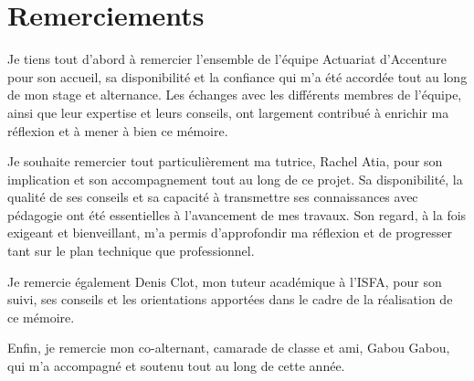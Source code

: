 \chapter*{Remerciements}
{}

Je tiens tout d'abord à remercier l'ensemble de l'équipe Actuariat d'Accenture pour son accueil, sa disponibilité et la confiance qui m'a été accordée tout au long de mon stage et alternance. Les échanges avec les différents membres de l'équipe, ainsi que leur expertise et leurs conseils, ont largement contribué à enrichir ma réflexion et à mener à bien ce mémoire.

Je souhaite remercier tout particulièrement ma tutrice, Rachel Atia, pour son implication et son accompagnement tout au long de ce projet. Sa disponibilité, la qualité de ses conseils et sa capacité à transmettre ses connaissances avec pédagogie ont été essentielles à l'avancement de mes travaux. Son regard, à la fois exigeant et bienveillant, m'a permis d'approfondir ma réflexion et de progresser tant sur le plan technique que professionnel.

Je remercie également Denis Clot, mon tuteur académique à l'ISFA, pour son suivi, ses conseils et les orientations apportées dans le cadre de la réalisation de ce mémoire.

Enfin, je remercie mon co-alternant, camarade de classe et ami, Gabou Gabou, qui m'a accompagné et soutenu tout au long de cette année.